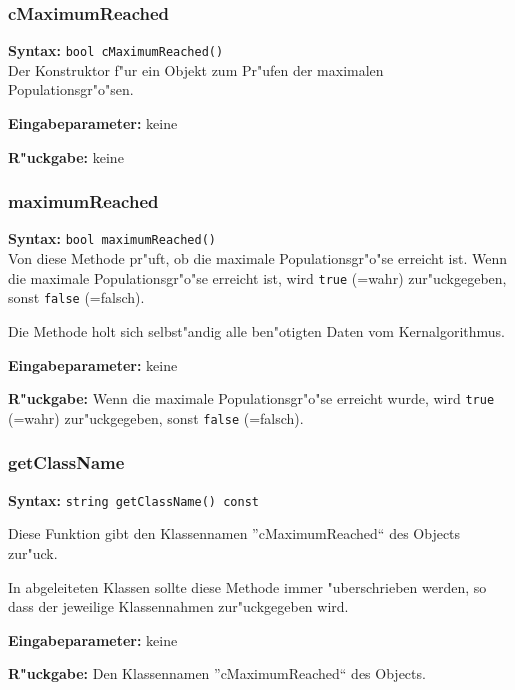 \subsubsection{cMaximumReached}

\textbf{Syntax:} \verb|bool cMaximumReached()| \\

Der Konstruktor f"ur ein Objekt zum Pr"ufen der maximalen Populationsgr"o"sen.

\bigskip\noindent
\textbf{Eingabeparameter:} keine

\bigskip\noindent
\textbf{R"uckgabe:} keine


\subsubsection{maximumReached}

\textbf{Syntax:} \verb|bool maximumReached()| \\

Von diese Methode pr"uft, ob die maximale Populationsgr"o"se erreicht ist. Wenn die maximale Populationsgr"o"se erreicht ist, wird \verb|true| (=wahr) zur"uckgegeben, sonst \verb|false| (=falsch).

Die Methode holt sich selbst"andig alle ben"otigten Daten vom Kernalgorithmus.

\bigskip\noindent
\textbf{Eingabeparameter:} keine

\bigskip\noindent
\textbf{R"uckgabe:} Wenn die maximale Populationsgr"o"se erreicht wurde, wird \verb|true| (=wahr) zur"uckgegeben, sonst \verb|false| (=falsch).


\subsubsection{getClassName}

\textbf{Syntax:} \verb|string getClassName() const|

\bigskip\noindent
Diese Funktion gibt den Klassennamen ''cMaximumReached`` des Objects zur"uck.

In abgeleiteten Klassen sollte diese Methode immer "uberschrieben werden, so dass der jeweilige Klassennahmen zur"uckgegeben wird.

\bigskip\noindent
\textbf{Eingabeparameter:} keine

\bigskip\noindent
\textbf{R"uckgabe:} Den Klassennamen ''cMaximumReached`` des Objects.



